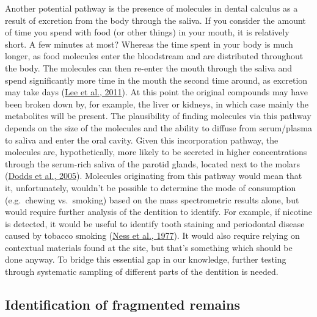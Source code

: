 \documentclass[
  b5paper,
]{book}
\begin{document}
Another potential pathway is the presence of molecules in dental
calculus as a result of excretion from the body through the saliva. If
you consider the amount of time you spend with food (or other things) in
your mouth, it is relatively short. A few minutes at most? Whereas the
time spent in your body is much longer, as food molecules enter the
bloodstream and are distributed throughout the body. The molecules can
then re-enter the mouth through the saliva and spend significantly more
time in the mouth the second time around, as excretion may take days
(\protect\hyperlink{ref-leeOralFluid2011}{Lee et al., 2011}). At this
point the original compounds may have been broken down by, for example,
the liver or kidneys, in which case mainly the metabolites will be
present. The plausibility of finding molecules via this pathway depends
on the size of the molecules and the ability to diffuse from
serum/plasma to saliva and enter the oral cavity. Given this
incorporation pathway, the molecules are, hypothetically, more likely to
be secreted in higher concentrations through the serum-rich saliva of
the parotid glands, located next to the molars
(\protect\hyperlink{ref-doddsHealthBenefits2005}{Dodds et al., 2005}).
Molecules originating from this pathway would mean that it,
unfortunately, wouldn't be possible to determine the mode of consumption
(e.g.~chewing vs.~smoking) based on the mass spectrometric results
alone, but would require further analysis of the dentition to identify.
For example, if nicotine is detected, it would be useful to identify
tooth staining and periodontal disease caused by tobacco smoking
(\protect\hyperlink{ref-nessEpidemiologicStudy1977}{Ness et al., 1977}).
It would also require relying on contextual materials found at the site,
but that's something which should be done anyway. To bridge this
essential gap in our knowledge, further testing through systematic
sampling of different parts of the dentition is needed.

\hypertarget{identification-of-fragmented-remains}{%
\subsection{Identification of fragmented
remains}\label{identification-of-fragmented-remains}}
\end{document}
